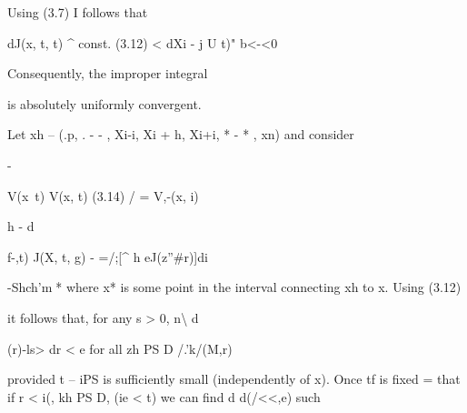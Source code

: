Using (3.7) I follows that

\begin{ocrformula}
dJ(x, t, t)             ^    const.
(3.12)                                            <
dXi                        -
j                             U     t)"         b<-<0
\end{ocrformula}

Consequently, the improper integral

\begin{ocrformula}
-"    - =          "  s
(3.13)                                Vi(*, 0                      t, r) d,
jl ^T J{*>
\end{ocrformula}

is absolutely uniformly convergent.

\begin{ocrformula}
Let xh --       (.p, . - - , Xi-i, Xi + h, Xi+i, * - * , xn) and                           consider
\end{ocrformula}

-

\begin{ocrformula}
V(x\     t)        V(x, t)
(3.14)       / =                                         V,-(x, i)
\end{ocrformula}

h - d

\begin{ocrformula}
f-,t)        J(X, t, g) -
=/;[^                         h                      eJ(z''#r)]di
\end{ocrformula}

\begin{ocrformula}
-Shch'^^-^^]*
where       x* is some       point      in the interval            connecting            xh to x. Using         (3.12)
\end{ocrformula}

it follows that, for any s > 0, n\textbackslash{} d

\begin{ocrformula}
(r)-ls>                                                    dr < e              for all zh PS D
/.'k/(M,r)
\end{ocrformula}

\begin{ocrformula}
provided   t -- iPS is sufficiently small                     (independently   of x). Once                   tf is fixed
=                                  that if r < i(, kh PS D,
(ie < t) we can find d      d(/<<,e) such
\end{ocrformula}


